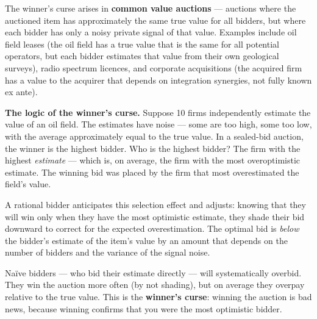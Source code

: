 \documentclass[12pt, letterpaper]{article}
\begin{document}
The winner's curse arises in \textbf{common value auctions} --- auctions where the auctioned item has approximately the same true value for all bidders, but where each bidder has only a noisy private signal of that value. Examples include oil field leases (the oil field has a true value that is the same for all potential operators, but each bidder estimates that value from their own geological surveys), radio spectrum licences, and corporate acquisitions (the acquired firm has a value to the acquirer that depends on integration synergies, not fully known ex ante).

\textbf{The logic of the winner's curse.} Suppose 10 firms independently estimate the value of an oil field. The estimates have noise --- some are too high, some too low, with the average approximately equal to the true value. In a sealed-bid auction, the winner is the highest bidder. Who is the highest bidder? The firm with the highest \textit{estimate} --- which is, on average, the firm with the most overoptimistic estimate. The winning bid was placed by the firm that most overestimated the field's value.

A rational bidder anticipates this selection effect and adjusts: knowing that they will win only when they have the most optimistic estimate, they shade their bid downward to correct for the expected overestimation. The optimal bid is \textit{below} the bidder's estimate of the item's value by an amount that depends on the number of bidders and the variance of the signal noise.

Naïve bidders --- who bid their estimate directly --- will systematically overbid. They win the auction more often (by not shading), but on average they overpay relative to the true value. This is the \textbf{winner's curse}: winning the auction is bad news, because winning confirms that you were the most optimistic bidder.
\end{document}
